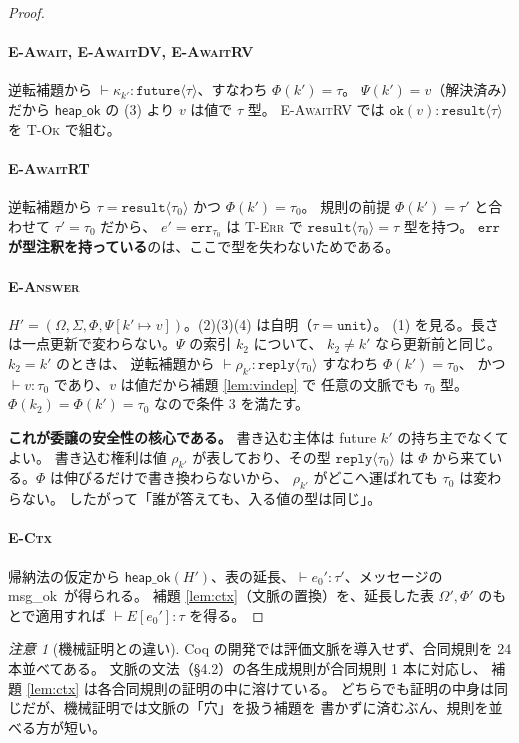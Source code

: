 \documentclass[11pt,a4paper]{ltjsarticle}
\theoremstyle{definition}
\theoremstyle{remark}
\newtheorem{remark}[theorem]{注意}
\newcommand{\tunit}{\ensuremath{\mathtt{unit}}}
\newcommand{\tfut}[1]{\ensuremath{\mathtt{future}\langle #1 \rangle}}
\newcommand{\trep}[1]{\ensuremath{\mathtt{reply}\langle #1 \rangle}}
\newcommand{\tres}[1]{\ensuremath{\mathtt{result}\langle #1 \rangle}}
\newcommand{\Om}{\Omega}
\newcommand{\Sm}{\Sigma}
\newcommand{\Ph}{\Phi}
\newcommand{\Ps}{\Psi}
\newcommand{\heapok}{\textsf{heap\_ok}}
\newcommand{\msgok}{\textsf{msg\_ok}}
\begin{document}
\begin{proof}
\paragraph{\textsc{E-Await}, \textsc{E-AwaitDV}, \textsc{E-AwaitRV}}
逆転補題から $\vdash \kappa_{k'} : \tfut{\tau}$、すなわち $\Ph(k') = \tau$。
$\Ps(k') = v$（解決済み）だから $\heapok$ の (3) より $v$ は値で $\tau$ 型。
\textsc{E-AwaitRV} では $\mathtt{ok}(v) : \tres{\tau}$ を \textsc{T-Ok} で組む。

\paragraph{\textsc{E-AwaitRT}}
逆転補題から $\tau = \tres{\tau_0}$ かつ $\Ph(k') = \tau_0$。
規則の前提 $\Ph(k') = \tau'$ と合わせて $\tau' = \tau_0$ だから、
$e' = \mathtt{err}_{\tau_0}$ は \textsc{T-Err} で $\tres{\tau_0} = \tau$ 型を持つ。
\textbf{$\mathtt{err}$ が型注釈を持っている}のは、ここで型を失わないためである。

\paragraph{\textsc{E-Answer}}
$H' = (\Om,\Sm,\Ph,\Ps[k'{\mapsto}v])$。(2)(3)(4) は自明（$\tau = \tunit$）。
(1) を見る。長さは一点更新で変わらない。$\Ps$ の索引 $k_2$ について、
$k_2 \neq k'$ なら更新前と同じ。$k_2 = k'$ のときは、
逆転補題から $\vdash \rho_{k'} : \trep{\tau_0}$ すなわち $\Ph(k') = \tau_0$、
かつ $\vdash v : \tau_0$ であり、$v$ は値だから補題 \ref{lem:vindep} で
任意の文脈でも $\tau_0$ 型。$\Ph(k_2) = \Ph(k') = \tau_0$ なので条件 3 を満たす。

\medskip
\textbf{これが委譲の安全性の核心である。}
書き込む主体は future $k'$ の持ち主でなくてよい。
書き込む権利は値 $\rho_{k'}$ が表しており、その型 \trep{\tau_0} は
$\Ph$ から来ている。$\Ph$ は伸びるだけで書き換わらないから、
$\rho_{k'}$ がどこへ運ばれても $\tau_0$ は変わらない。
したがって「誰が答えても、入る値の型は同じ」。

\paragraph{\textsc{E-Ctx}}
帰納法の仮定から $\heapok(H')$、表の延長、$\vdash e_0' : \tau'$、メッセージの \msgok\ が得られる。
補題 \ref{lem:ctx}（文脈の置換）を、延長した表 $\Om',\Ph'$ のもとで適用すれば
$\vdash E[e_0'] : \tau$ を得る。
\end{proof}

\begin{remark}[機械証明との違い]
Coq の開発では評価文脈を導入せず、合同規則を 24 本並べてある。
文脈の文法（\S4.2）の各生成規則が合同規則 1 本に対応し、
補題 \ref{lem:ctx} は各合同規則の証明の中に溶けている。
どちらでも証明の中身は同じだが、機械証明では文脈の「穴」を扱う補題を
書かずに済むぶん、規則を並べる方が短い。
\end{remark}
\end{document}
